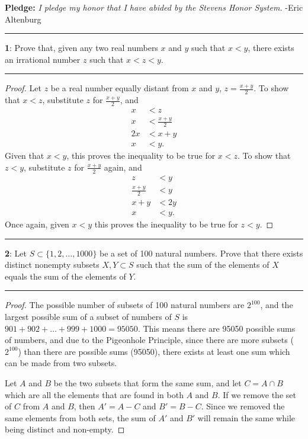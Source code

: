 \documentclass[11pt]{article}
\newcommand\question[2]{\vspace{.25in}\hrule\textbf{#1}: #2\vspace{.5em}\hrule\vspace{.10in}}
\begin{document}
\raggedright
\newcommand\NAME{Eric Altenburg}  %
\newcommand\COURSE{MA-240}
\newcommand\HWNUM{5}              %


\textbf{Pledge:} \textit{I pledge my honor that I have abided by the Stevens Honor System.} -Eric Altenburg

\question{1}{Prove that, given any two real numbers $x$ and $y$ such that $x < y$, there exists an irrational number $z$ such that $x < z < y$.}

\begin{proof}
	Let $z$ be a real number equally distant from $x$ and $y$, $z = \frac{x+y}{2}$. To show that $x<z$, substitute $z$ for $\frac{x+y}{2}$, and
	\begin{align*}
		x &< z\\
		x &< \frac{x+y}{2}\\
		2x &< x+y\\
		x &< y.
	\end{align*} 
	Given that $x<y$, this proves the inequality to be true for $x<z$. To show that $z<y$, substitute $z$ for $\frac{x+y}{2}$ again, and 
	\begin{align*}
		z &< y\\
		\frac{x+y}{2} &< y\\
		x + y &< 2y\\
		x &< y.
	\end{align*}
	Once again, given $x<y$ this proves the inequality to be true for $z<y$.
\end{proof}

\question{2}{Let $S\subset\{1,2,\ldots,1000\}$ be a set of 100 natural numbers. Prove that there exists distinct nonempty subsets $X,Y \subset S$ such that the sum of the elements of $X$ equals the sum of the elements of $Y$.}

\begin{proof}
	The possible number of subsets of 100 natural numbers are $2^{100}$, and the largest possible sum of a subset of numbers of $S$ is $901 + 902 + \ldots + 999 + 1000 = 95050$. This means there are 95050 possible sums of numbers, and due to the Pigeonhole Principle, since there are more subsets ($2^{100}$) than there are possible sums (95050), there exists at least one sum which can be made from two subsets. 

	Let $A$ and $B$ be the two subsets that form the same sum, and let $C = A \cap B$ which are all the elements that are found in both $A$ and $B$. If we remove the set of $C$ from $A$ and $B$, then $A' = A - C$ and $B' = B-C$. Since we removed the same elements from both sets, the sum of $A'$ and $B'$ will remain the same while being distinct and non-empty. 
\end{proof}
\end{document}
